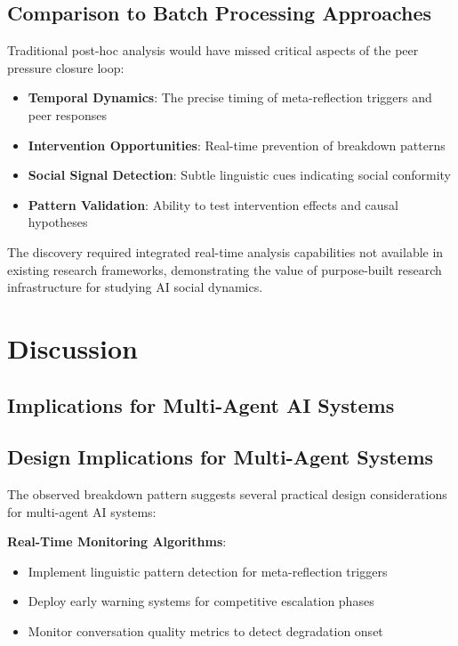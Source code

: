 \documentclass[11pt,letterpaper]{article}
\begin{document}
\subsection{Comparison to Batch Processing Approaches}

Traditional post-hoc analysis would have missed critical aspects of the peer pressure closure loop:

\begin{itemize}
    \item \textbf{Temporal Dynamics}: The precise timing of meta-reflection triggers and peer responses
    \item \textbf{Intervention Opportunities}: Real-time prevention of breakdown patterns
    \item \textbf{Social Signal Detection}: Subtle linguistic cues indicating social conformity
    \item \textbf{Pattern Validation}: Ability to test intervention effects and causal hypotheses
\end{itemize}

The discovery required integrated real-time analysis capabilities not available in existing research frameworks, demonstrating the value of purpose-built research infrastructure for studying AI social dynamics.

\section{Discussion}

\subsection{Implications for Multi-Agent AI Systems}

\subsection{Design Implications for Multi-Agent Systems}

The observed breakdown pattern suggests several practical design considerations for multi-agent AI systems:

\textbf{Real-Time Monitoring Algorithms}:
\begin{itemize}
    \item Implement linguistic pattern detection for meta-reflection triggers
    \item Deploy early warning systems for competitive escalation phases
    \item Monitor conversation quality metrics to detect degradation onset
\end{itemize}
\end{document}
